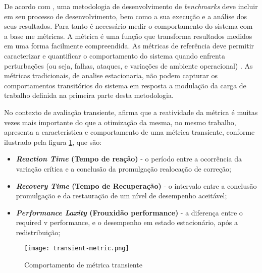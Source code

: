 De acordo com \cite{KaiSachs2010}, uma metodologia de desenvolvimento de \textit{benchmarks} deve incluir em seu processo de desenvolvimento, bem como a sua execução e a análise dos seus resultados. Para tanto é necessário medir o comportamento do sistema com a base me métricas. A métrica é uma função que transforma resultados medidos em uma forma facilmente compreendida. \cite{Folkerts2013} As métricas de referência deve permitir caracterizar e quantificar o comportamento do sistema quando enfrenta perturbações (ou seja, falhas, ataques, e variações de ambiente operacional) \cite{Marco2012}. As métricas tradicionais, de analise estacionaria, não podem capturar os comportamentos transitórios do sistema em resposta a modulação da carga de trabalho definida na primeira parte desta metodologia.

No contexto de avaliação transiente, \cite{Rosu1997} afirma que a reatividade da métrica é muitas vezes mais importante do que a otimização da mesma, no mesmo trabalho, \cite{Rosu1997} apresenta a característica e comportamento de uma métrica transiente, conforme ilustrado pela figura \ref{fig:transient-metric}, que são: 
\begin{itemize}
	\item \textbf{\textit{Reaction Time} (Tempo de reação)} - o período entre a ocorrência da variação crítica e a conclusão da promulgação realocação de correção;
	
	\item \textbf{\textit{Recovery Time} (Tempo de Recuperação)}  - o intervalo entre a conclusão promulgação e da restauração de um nível de desempenho aceitável;
	
	\item \textbf{\textit{Performance Laxity} (Frouxidão performance)} - a diferença entre o required v performance, e o desempenho em estado estacionário, após a redistribuição;
\end{itemize}


\begin{figure}[!htb]
	\centering
	\texttt{[image: transient-metric.png]}
	\caption{Comportamento de métrica transiente}
	\label{fig:transient-metric}
\end{figure}


